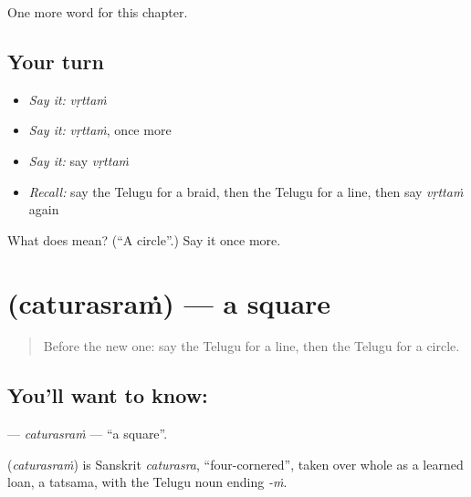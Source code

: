 \begin{grammarlens}[title={What you've built}]
One more word for this chapter.
\end{grammarlens}

\subsection*{Your turn}
\begin{itemize}
\raggedright
  \item \emph{Say it:} \emph{vṛttaṁ}
  \item \emph{Say it:} \emph{vṛttaṁ}, once more
  \item \emph{Say it:} say \emph{vṛttaṁ}
  \item \emph{Recall:} say the Telugu for a braid, then the Telugu for a line, then say \emph{vṛttaṁ} again
\end{itemize}

\begin{tcolorbox}[breakable,colback=teal!4,colframe=teal!35!black,title={Before you move on}]
What does  mean? (\textquotedblleft{}A circle\textquotedblright{}.) Say it once more.
\end{tcolorbox}
\section[\texorpdfstring{\te{చతురస్రం} (caturasraṁ)}{చతురస్రం (caturasraṁ)}]{ (caturasraṁ) — a square}

\label{lesson:TE-C193-caturasram}



\begin{quote}
Before the new one: say the Telugu for a line, then the Telugu for a circle.
\end{quote}

\subsection*{You'll want to know: }
\textbf{} — \emph{caturasraṁ} — \textquotedblleft{}a square\textquotedblright{}.

\begin{cousinweb}
\textbf{} (\emph{caturasraṁ}) is Sanskrit \emph{caturasra}, \textquotedblleft{}four-cornered\textquotedblright{}, taken over whole as a learned loan, a tatsama, with the Telugu noun ending \emph{-ṁ}.
\end{cousinweb}


